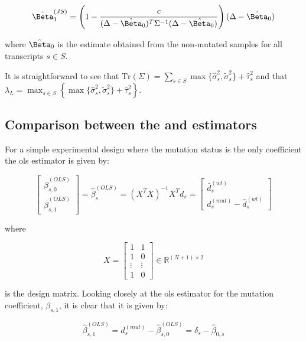 \begin{equation}
  \hat{\Beta}_1^{(JS)} = \left( 1 - \frac{c}{(\Delta - \hat{\Beta}_0)^T \Sigma^{-1} (\Delta - \hat{\Beta}_0)} \right)(\Delta - \hat{\Beta}_0)
  \label{eqn:js_defn}
\end{equation}

where $\hat{\Beta}_0$ is the estimate obtained from the non-mutated samples for all transcripts $s \in S$.

It is straightforward to see that $\text{Tr}(\Sigma) = \sum_{s \in S} \max\{ \hat{\sigma}_s^2, \tilde{\sigma}_s^2 \} + \hat{\tau}_s^2$ and that $\lambda_L = \max_{s \in S} \left\{ \max\{ \hat{\sigma}_s^2, \tilde{\sigma}_s^2 \} + \hat{\tau}_s^2 \right\}$.

\subsection{Comparison between the  and  estimators}

For a simple experimental design where the mutation status is the only coefficient the \gls{ols} estimator is given by:

\begin{equation*}
  \begin{bmatrix}
    \hat{\beta}_{s,0}^{(OLS)} \\
    \hat{\beta}_{s,1}^{(OLS)}
  \end{bmatrix}
  = \hat{\beta}_s^{(OLS)}
  = (X^TX)^{-1}X^T d_s
  = \begin{bmatrix}
    \bar{d}_s^{(wt)} \\
    d_s^{(mut)} - \bar{d}_s^{(wt)}
  \end{bmatrix}
\end{equation*}

where

\begin{equation*}
  X = \begin{bmatrix}
    1 & 1 \\
    1 & 0 \\
    \vdots & \vdots \\
    1 & 0
  \end{bmatrix}
  \in \mathbb{R}^{(N + 1) \times 2}
\end{equation*}

is the design matrix.
Looking closely at the \gls{ols} estimator for the mutation coefficient, $\beta_{s,1}$, it is clear that it is given by:

\begin{equation}
  \hat{\beta}_{s,1}^{(OLS)} = d_s^{(mut)} - \hat{\beta}_{s,0}^{(OLS)} = \delta_s - \hat{\beta}_{0,s}
\end{equation}

